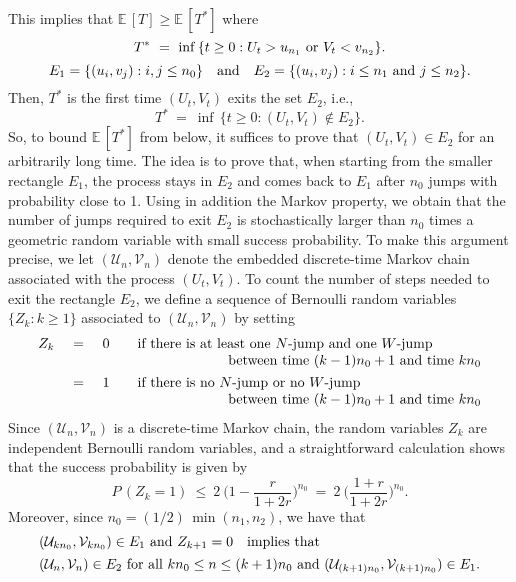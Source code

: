  This implies that ${\mathbb{E}} \,[T] \geq {\mathbb{E}} \,[T^*]$ where
 $$ T^* \ = \ \inf \,\{t \geq 0 : U_t > u_{n_1} \ \hbox{or} \ V_t < v_{n_2} \}. $$
 $$ E_1 = \{(u_i, v_j) : i, j \leq n_0 \} \quad \hbox{and} \quad
    E_2 = \{(u_i, v_j) : i \leq n_1 \ \hbox{and} \ j \leq n_2 \}. $$
 Then, $T^*$ is the first time $(U_t, V_t)$ exits the set $E_2$, i.e.,
 $$ T^* \ = \ \inf \,\{t \geq 0 : (U_t, V_t) \notin E_2 \}. $$
 So, to bound ${\mathbb{E}} \,[T^*]$ from below, it suffices to prove that $(U_t, V_t) \in E_2$ for an arbitrarily long time.
 The idea is to prove that, when starting from the smaller rectangle $E_1$, the process stays in $E_2$ and comes back to $E_1$
 after $n_0$ jumps with probability close to 1.
 Using in addition the Markov property, we obtain that the number of jumps required to exit $E_2$ is stochastically
 larger than $n_0$ times a geometric random variable with small success probability.
 To make this argument precise, we let $({\mathcal U}_n, {\mathcal V}_n)$ denote the embedded discrete-time Markov chain associated
 with the process $(U_t, V_t)$.
 To count the number of steps needed to exit the rectangle $E_2$, we define a sequence of Bernoulli random variables
 $\{Z_k : k \geq 1 \}$ associated to $({\mathcal U}_n, {\mathcal V}_n)$ by setting
 $$ \begin{array}{rcll}
     Z_k & \ = \ & 0 & \quad \hbox{if there is at least one $N$-jump and one $W$-jump} \\
         &&& \hspace{75pt} \hbox{between time $(k - 1) n_0 + 1$ and time $k n_0$} \vspace{4pt} \\
         & \ = \ & 1 & \quad \hbox{if there is no $N$-jump or no $W$-jump} \\
         &&& \hspace{75pt} \hbox{between time $(k - 1) n_0 + 1$ and time $k n_0$} \end{array} $$
 Since $({\mathcal U}_n, {\mathcal V}_n)$ is a discrete-time Markov chain, the random variables $Z_k$ are independent Bernoulli random
 variables, and a straightforward calculation shows that the success probability is given by
 $$ P \,(Z_k = 1) \ \leq \ 2 \ \bigg(1 - \frac{r}{1 + 2r} \bigg)^{n_0} \ = \ 2 \ \bigg(\frac{1 + r}{1 + 2r} \bigg)^{n_0}. $$
 Moreover, since $n_0 = (1 / 2) \,\min (n_1, n_2)$, we have that
 $$ \begin{array}{l}
   ({\mathcal U}_{k n_0}, {\mathcal V}_{k n_0}) \in E_1 \ \hbox{and} \ Z_{k + 1} = 0 \quad \hbox{implies that} \vspace{4pt} \\ \hspace{0pt}
   ({\mathcal U}_n, {\mathcal V}_n) \in E_2 \ \hbox{for all} \ k n_0 \leq n \leq (k + 1) n_0 \ \hbox{and} \
   ({\mathcal U}_{(k + 1) n_0}, {\mathcal V}_{(k + 1) n_0}) \in E_1. \end{array} $$
